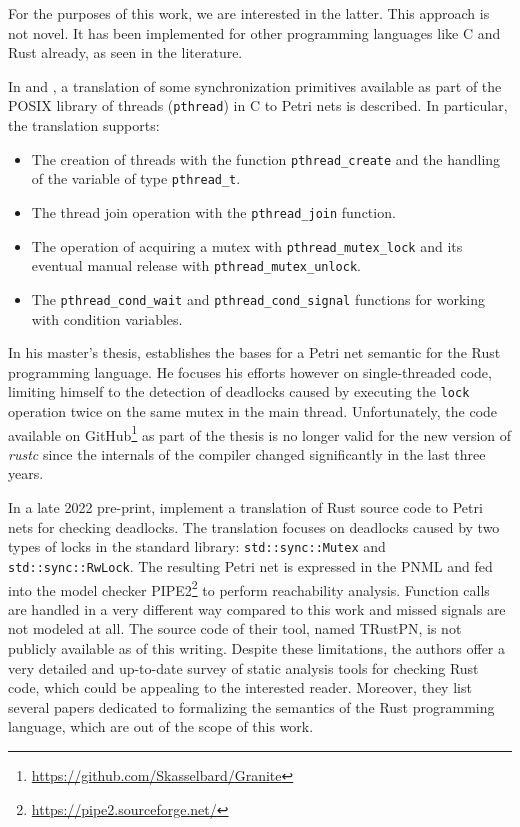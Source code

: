 For the purposes of this work, we are interested in the latter.
This approach is not novel.
It has been implemented for other programming languages like C and Rust already,
as seen in the literature.

In \cite{kavi2002modeling} and \cite{moshtaghi2001},
a translation of some synchronization primitives available as part of
the POSIX library of threads (\texttt{pthread}) in C to Petri nets is described.
In particular, the translation supports:

\begin{itemize}
    \item The creation of threads with the function \texttt{pthread\_create}
          and the handling of the variable of type \texttt{pthread\_t}.
    \item The thread join operation with the \texttt{pthread\_join} function.
    \item The operation of acquiring a mutex with \texttt{pthread\_mutex\_lock}
          and its eventual manual release with \texttt{pthread\_mutex\_unlock}.
    \item The \texttt{pthread\_cond\_wait} and \texttt{pthread\_cond\_signal} functions
          for working with condition variables.
\end{itemize}

In his master's thesis, \cite{meyer2020} establishes
the bases for a Petri net semantic for the Rust programming language.
He focuses his efforts however on single-threaded code,
limiting himself to the detection of deadlocks caused by
executing the \texttt{lock} operation twice on the same mutex in the main thread.
Unfortunately, the code available on GitHub\footnote{\url{https://github.com/Skasselbard/Granite}}
as part of the thesis is no longer valid for the new version of \emph{rustc}
since the internals of the compiler changed significantly in the last three years.

In a late 2022 pre-print, \cite{zhang2022deadlocks} implement a translation
of Rust source code to Petri nets for checking deadlocks.
The translation focuses on deadlocks caused by two types of locks
in the standard library: \texttt{std::sync::Mutex} and \texttt{std::sync::RwLock}.
The resulting Petri net is expressed in the \acrfull{PNML}
and fed into the model checker \acrfull{PIPE2}\footnote{\url{https://pipe2.sourceforge.net/}}
to perform reachability analysis.
Function calls are handled in a very different way compared to this work and
missed signals are not modeled at all.
The source code of their tool, named TRustPN, is not publicly available as of this writing.
Despite these limitations, the authors offer a very detailed and up-to-date survey
of static analysis tools for checking Rust code,
which could be appealing to the interested reader.
Moreover, they list several papers dedicated to
formalizing the semantics of the Rust programming language,
which are out of the scope of this work.